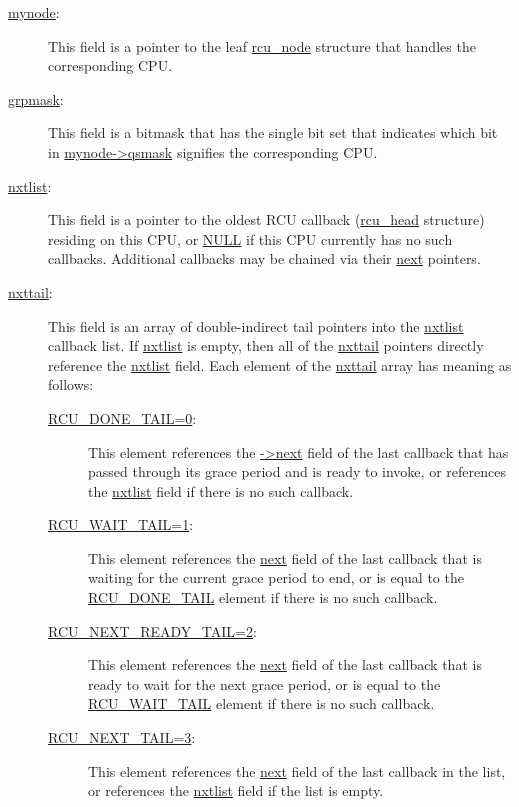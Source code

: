 \begin{description}
\item[\url{mynode}:]
	This field is a pointer to the leaf \url{rcu_node} structure that
	handles the corresponding CPU.
\item[\url{grpmask}:]
	This field is a bitmask that has the single bit set that indicates
	which bit in \url{mynode->qsmask} signifies the corresponding CPU.
\item[\url{nxtlist}:]
	This field is a pointer to the oldest RCU callback (\url{rcu_head}
	structure) residing on this CPU, or \url{NULL} if this CPU currently
	has no such callbacks.
	Additional callbacks may be chained via their \url{next} pointers.
\item[\url{nxttail}:]
	This field is an array of double-indirect tail pointers
	into the \url{nxtlist} callback list.
	If \url{nxtlist} is empty, then all of the \url{nxttail} pointers
	directly reference the \url{nxtlist} field.
	Each element of the \url{nxttail} array has meaning as follows:
	\begin{description}
	\item[\url{RCU_DONE_TAIL=0}:]
		This element references the \url{->next} field of
		the last callback that has passed through its grace
		period and is ready to invoke, or references the \url{nxtlist}
		field if there is no such callback.
	\item[\url{RCU_WAIT_TAIL=1}:]
		This element references the \url{next} field of the
		last callback that is waiting for the current grace
		period to end, or is equal to the \url{RCU_DONE_TAIL}
		element if there is no such callback.
	\item[\url{RCU_NEXT_READY_TAIL=2}:]
		This element references the \url{next} field of the
		last callback that is ready to wait for the next
		grace period, or is equal to the \url{RCU_WAIT_TAIL}
		element if there is no such callback.
	\item[\url{RCU_NEXT_TAIL=3}:]
		This element references the \url{next} field of the
		last callback in the list, or references the \url{nxtlist}
		field if the list is empty.
	\end{description}

 \QuickQuizEnd


\end{description}
